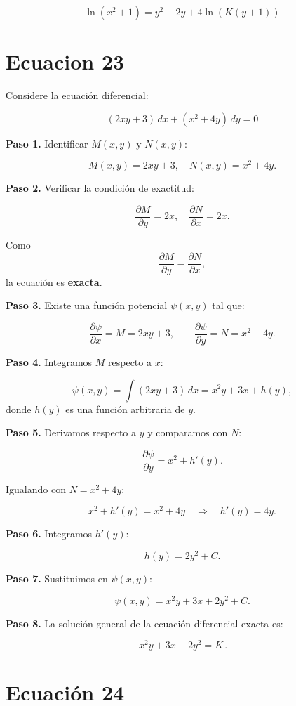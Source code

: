 \documentclass[12pt,a4paper]{article}
\begin{document}
\begin{multicols}{2}
	\[
	\boxed{\ln(x^2 + 1) = y^2 - 2y + 4\ln(K(y + 1))}
	\]
	\section*{Ecuacion 23}
	
	Considere la ecuación diferencial:
	
	\[
	(2xy + 3)\,dx + (x^2 + 4y)\,dy = 0
	\]
	
	\textbf{Paso 1.} Identificar \(M(x,y)\) y \(N(x,y)\):
	
	\[
	M(x,y) = 2xy + 3, \quad N(x,y) = x^2 + 4y.
	\]
	
	\textbf{Paso 2.} Verificar la condición de exactitud:
	
	\[
	\frac{\partial M}{\partial y} = 2x, \quad \frac{\partial N}{\partial x} = 2x.
	\]
	
	Como 
	\[
	\frac{\partial M}{\partial y} = \frac{\partial N}{\partial x},
	\]
	la ecuación es \textbf{exacta}.
	
	\textbf{Paso 3.} Existe una función potencial \(\psi(x,y)\) tal que:
	
	\[
	\frac{\partial \psi}{\partial x} = M = 2xy + 3, \qquad
	\frac{\partial \psi}{\partial y} = N = x^2 + 4y.
	\]
	
	\textbf{Paso 4.} Integramos \(M\) respecto a \(x\):
	
	\[
	\psi(x,y) = \int (2xy + 3)\,dx = x^2y + 3x + h(y),
	\]
	donde \(h(y)\) es una función arbitraria de \(y\).
	
	\textbf{Paso 5.} Derivamos respecto a \(y\) y comparamos con \(N\):
	
	\[
	\frac{\partial \psi}{\partial y} = x^2 + h'(y).
	\]
	
	Igualando con \(N = x^2 + 4y\):
	
	\[
	x^2 + h'(y) = x^2 + 4y \quad \Rightarrow \quad h'(y) = 4y.
	\]
	
	\textbf{Paso 6.} Integramos \(h'(y)\):
	
	\[
	h(y) = 2y^2 + C.
	\]
	
	\textbf{Paso 7.} Sustituimos en \(\psi(x,y)\):
	
	\[
	\psi(x,y) = x^2y + 3x + 2y^2 + C.
	\]
	
	\textbf{Paso 8.} La solución general de la ecuación diferencial exacta es:
	
	\[
	\boxed{\,x^2y + 3x + 2y^2 = K\,}.
	\]
	
	\section*{Ecuación 24}
	

\end{multicols}
\end{document}

